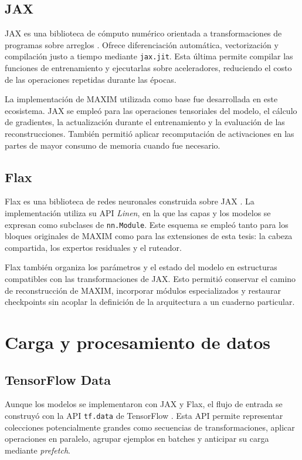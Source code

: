 \documentclass[
  11pt,
  oneside,
  english,
  spanish,
  singlespacing,
  headsepline
]{MastersDoctoralThesis}
\begin{document}
\subsection{JAX}

JAX es una biblioteca de cómputo numérico orientada a transformaciones de programas sobre arreglos \citep{jax2018}. Ofrece diferenciación automática, vectorización y compilación justo a tiempo mediante \texttt{jax.jit}. Esta última permite compilar las funciones de entrenamiento y ejecutarlas sobre aceleradores, reduciendo el costo de las operaciones repetidas durante las épocas.

La implementación de MAXIM utilizada como base fue desarrollada en este ecosistema. JAX se empleó para las operaciones tensoriales del modelo, el cálculo de gradientes, la actualización durante el entrenamiento y la evaluación de las reconstrucciones. También permitió aplicar recomputación de activaciones en las partes de mayor consumo de memoria cuando fue necesario.

\subsection{Flax}

Flax es una biblioteca de redes neuronales construida sobre JAX \citep{flax2023}. La implementación utiliza su API \textit{Linen}, en la que las capas y los modelos se expresan como subclases de \texttt{nn.Module}. Este esquema se empleó tanto para los bloques originales de MAXIM como para las extensiones de esta tesis: la cabeza compartida, los expertos residuales y el ruteador.

Flax también organiza los parámetros y el estado del modelo en estructuras compatibles con las transformaciones de JAX. Esto permitió conservar el camino de reconstrucción de MAXIM, incorporar módulos especializados y restaurar checkpoints sin acoplar la definición de la arquitectura a un cuaderno particular.

\section{Carga y procesamiento de datos}

\subsection{TensorFlow Data}

Aunque los modelos se implementaron con JAX y Flax, el flujo de entrada se construyó con la API \texttt{tf.data} de TensorFlow \citep{tensorflow2016}. Esta API permite representar colecciones potencialmente grandes como secuencias de transformaciones, aplicar operaciones en paralelo, agrupar ejemplos en batches y anticipar su carga mediante \textit{prefetch}.
\end{document}
